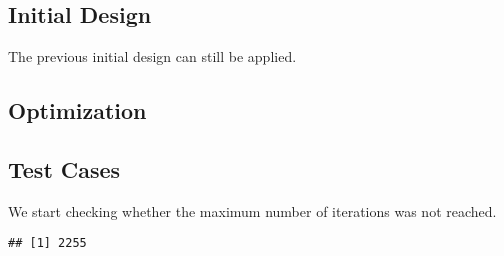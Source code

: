\documentclass[
]{book}
\newenvironment{Shaded}{\begin{snugshade}}{\end{snugshade}}
\newcommand{\DataTypeTok}[1]{\textcolor[rgb]{0.13,0.29,0.53}{#1}}
\newcommand{\DecValTok}[1]{\textcolor[rgb]{0.00,0.00,0.81}{#1}}
\newcommand{\KeywordTok}[1]{\textcolor[rgb]{0.13,0.29,0.53}{\textbf{#1}}}
\newcommand{\NormalTok}[1]{#1}
\newcommand{\OperatorTok}[1]{\textcolor[rgb]{0.81,0.36,0.00}{\textbf{#1}}}
\newcommand{\StringTok}[1]{\textcolor[rgb]{0.31,0.60,0.02}{#1}}
\begin{document}
\hypertarget{initial-design-4}{%
\subsection{Initial Design}\label{initial-design-4}}

The previous initial design can still be applied.

\hypertarget{optimization-5}{%
\subsection{Optimization}\label{optimization-5}}

\begin{Shaded}
\end{Shaded}

\hypertarget{test-cases-5}{%
\subsection{Test Cases}\label{test-cases-5}}

We start checking whether the maximum number of iterations was not reached.

\begin{Shaded}
\end{Shaded}

\begin{verbatim}
## [1] 2255
\end{verbatim}

\begin{Shaded}
\end{Shaded}
\end{document}
